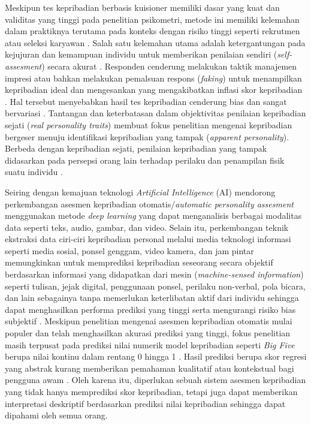 Meskipun tes kepribadian berbasis kuisioner memiliki dasar yang kuat dan validitas yang tinggi pada penelitian psikometri, metode ini memiliki kelemahan dalam praktiknya terutama pada konteks dengan risiko tinggi seperti rekrutmen atau seleksi karyawan \parencite{Hilliard2022}. Salah satu kelemahan utama adalah ketergantungan pada kejujuran dan kemampuan individu untuk memberikan penilaian sendiri (\textit{self-assesment}) secara akurat \parencite{Tavakol2021}. Responden cenderung melakukan taktik manajemen impresi atau bahkan melakukan pemalsuan respons (\textit{faking}) untuk menampilkan kepribadian ideal dan mengesankan yang mengakibatkan inflasi skor kepribadian  \parencite{Krishnamurthy2022,Hilliard2022}. Hal tersebut menyebabkan hasil tes kepribadian cenderung bias dan sangat bervariasi \parencite{Ponce-Lpez2016}. Tantangan dan keterbatasan dalam objektivitas penilaian kepribadian sejati (\textit{real personality traits}) membuat fokus penelitian mengenai kepribadian bergeser menuju identifikasi kepribadian yang tampak (\textit{apparent personality}). Berbeda dengan kepribadian sejati, penilaian kepribadian yang tampak didasarkan pada persepsi orang lain terhadap perilaku dan penampilan fisik suatu individu \parencite{Ilmini2024}.

Seiring dengan kemajuan teknologi \textit{Artificial Intelligence} (AI) mendorong perkembangan asesmen kepribadian otomatis/\textit{automatic personality assesment} menggunakan metode \textit{deep learning} yang dapat menganalisis berbagai modalitas data seperti teks, audio, gambar, dan video. Selain itu, perkembangan teknik ekstraksi data ciri-ciri kepribadian personal melalui media teknologi informasi seperti media sosial, ponsel genggam, video kamera, dan jam pintar memungkinkan untuk memprediksi kepribadian seseorang secara objektif berdasarkan informasi yang didapatkan dari mesin (\textit{machine-sensed information}) seperti tulisan, jejak digital, penggunaan ponsel, perilaku non-verbal, pola bicara, dan lain sebagainya tanpa memerlukan keterlibatan aktif dari individu sehingga dapat menghasilkan performa prediksi yang tinggi serta mengurangi risiko bias subjektif \parencite{Phan2021,Shui2023}. Meskipun penelitian mengenai asesmen kepribadian otomatis mulai populer dan telah menghasilkan akurasi prediksi yang tinggi, fokus penelitian masih terpusat pada prediksi nilai numerik model kepribadian seperti \textit{Big Five} berupa nilai kontinu dalam rentang 0 hingga 1 \parencite{Suman2022}. Hasil prediksi berupa skor regresi yang abstrak kurang memberikan pemahaman kualitatif atau kontekstual bagi pengguna awam \parencite{Ilmini2024}. Oleh karena itu, diperlukan sebuah sistem asesmen kepribadian yang tidak hanya memprediksi skor kepribadian, tetapi juga dapat memberikan interpretasi deskriptif berdasarkan prediksi nilai kepribadian sehingga dapat dipahami oleh semua orang.


